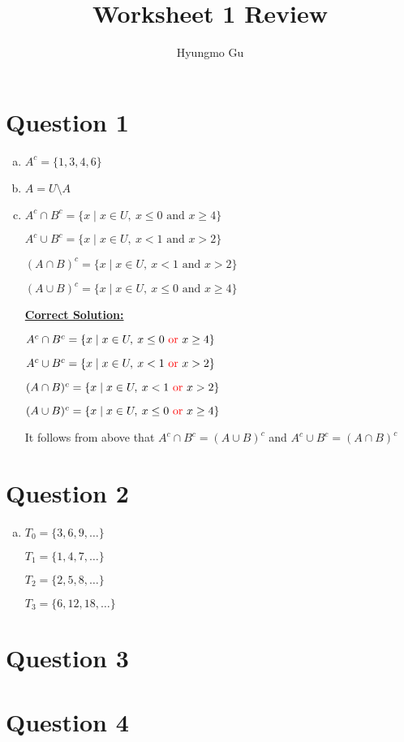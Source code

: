 \documentclass[12pt]{article}
\begin{document}
\title{Worksheet 1 Review}
\author{Hyungmo Gu}
\maketitle

\section*{Question 1}
\begin{enumerate}[a.]
    \item $A^c = \{1,3,4,6\}$
    \item $A = U \setminus A$
    \item

    $A^c \cap B^c = \{ x \mid x \in U,\:x \leq 0 \text{ and } x \geq 4 \}$

    $A^c \cup B^c = \{ x \mid x \in U,\:x < 1 \text{ and } x > 2 \}$

    $(A \cap B)^c = \{ x \mid x \in U,\:x < 1 \text{ and } x > 2\}$

    $(A \cup B)^c = \{ x \mid x \in U,\:x \leq 0 \text{ and } x \geq 4\}$

    \bigskip

    \begin{mdframed}
        \underline{\textbf{Correct Solution:}}

        \bigskip

        $A^c \cap B^c = \{ x \mid x \in U,\:x \leq 0 \color{red}\text{ or }\color{black} x \geq 4 \}$

        $A^c \cup B^c = \{ x \mid x \in U,\:x < 1 \color{red}\text{ or }\color{black} x > 2 \}$

        $(A \cap B)^c = \{ x \mid x \in U,\:x < 1 \color{red}\text{ or }\color{black} x > 2\}$

        $(A \cup B)^c = \{ x \mid x \in U,\:x \leq 0 \color{red}\text{ or }\color{black} x \geq 4\}$

        \color{red}It follows from above that $A^c \cap B^c = (A \cup B)^c$ and
        $A^c \cup B^c = (A \cap B)^c$\color{black}

    \end{mdframed}

\end{enumerate}

\section*{Question 2}
\begin{enumerate}[a.]
    \item

    $T_0 = \{3,6,9,\dots\}$

    $T_1 = \{1,4,7,\dots\}$

    $T_2 = \{2,5,8,\dots\}$

    $T_3 = \{6,12,18,\dots\}$

\end{enumerate}


\section*{Question 3}

\section*{Question 4}
\end{document}
